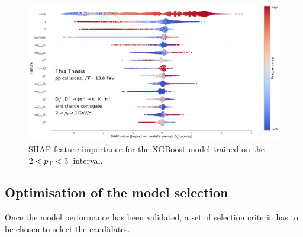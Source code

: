 \begin{figure}[htb]
    \centering
    \includegraphics[width=\textwidth]{Figures/Chapter 5/shap.pdf}
    \caption{SHAP feature importance for the XGBoost model trained on the $2<p_\mathrm{T}<3$~\gevc interval.}
    \label{fig:ml_feature_importance}
\end{figure}

\subsection{Optimisation of the model selection}
Once the model performance has been validated, a set of selection criteria has to be chosen to select the candidates. 